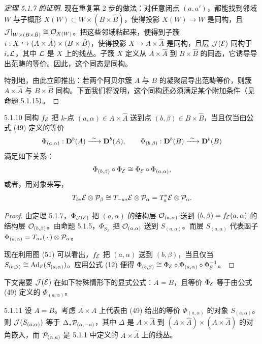 \begin{proof}[定理 5.1.7 的证明]
现在重复第 2 步的做法：对任意闭点 $(a,a')$，都能找到邻域 $W$ 与子概形 $X(W)\subset W\times(B\times\hat B)$，使得投影 $X(W)\to W$ 是同构，且 $\mathcal{J}|_{W\times(B\times\hat B)}\cong\mathcal{O}_{X(W)}$。把这些邻域粘起来，便得到子簇 $i:X\hookrightarrow(A\times\hat A)\times(B\times\hat B)$，使得投影 $X\to A\times\hat A$ 是同构，且层 $\mathcal{J}(\mathcal{E})$ 同构于 $i_*\mathcal{L}$，其中 $\mathcal{L}$ 是 $X$ 上的线丛。子簇 $X$ 定义从 $A\times\hat A$ 到 $B\times\hat B$ 的同态，它诱导导出范畴的等价。因此，这个同态是同构。

特别地，由此立即推出：若两个阿贝尔簇 $A$ 与 $B$ 的凝聚层导出范畴等价，则簇 $A\times\hat A$ 与 $B\times\hat B$ 同构。下面我们将说明，这个同构还必须满足某个附加条件（见命题 5.1.15）。
\end{proof}

\begin{corollary}{5.1.10}
同构 $f_{\mathcal{E}}$ 把 $k$-点 $(a,\alpha)\in A\times\hat A$ 送到点 $(b,\beta)\in B\times\hat B$，当且仅当由公式 (49) 定义的等价
\begin{equation*}
\Phi_{(a,\alpha)}:\mathbf{D}^{b}(A)\xrightarrow{\ \sim\ }\mathbf{D}^{b}(A),\qquad
\Phi_{(b,\beta)}:\mathbf{D}^{b}(B)\xrightarrow{\ \sim\ }\mathbf{D}^{b}(B)
\end{equation*}
满足如下关系：
\begin{equation*}
\Phi_{(b,\beta)}\circ\Phi_{\mathcal{E}}\cong\Phi_{\mathcal{E}}\circ\Phi_{(a,\alpha)},
\end{equation*}
或者，用对象来写，
\begin{equation*}
T_{b*}\mathcal{E}\otimes\mathcal{P}_\beta\cong T_{-a*}\mathcal{E}\otimes\mathcal{P}_\alpha=T^*_a\mathcal{E}\otimes\mathcal{P}_\alpha.
\end{equation*}
\end{corollary}

\begin{proof}
由定理 5.1.7，$\Phi_{\mathcal{J}(\mathcal{E})}$ 把 $(a,\alpha)$ 的结构层 $\mathcal{O}_{(a,\alpha)}$ 送到 $(b,\beta)=f_{\mathcal{E}}(a,\alpha)$ 的结构层 $\mathcal{O}_{(b,\beta)}$。由命题 5.1.5，$\Phi_{S_A}$ 把 $\mathcal{O}_{(a,\alpha)}$ 送到 $S_{(a,\alpha)}$。而层 $S_{(a,\alpha)}$ 代表函子 $\Phi_{(a,\alpha)}=T_{a*}(\,\cdot\,)\otimes\mathcal{P}_\alpha$。

现在利用图 (51) 可以看出，$f_{\mathcal{E}}$ 把 $(a,\alpha)$ 送到 $(b,\beta)$，当且仅当 $S_{(b,\beta)}\cong\mathrm{Ad}_{\mathcal{E}}(S_{(a,\alpha)})$。应用公式 (12) 便得 $\Phi_{(b,\beta)}\cong\Phi_{\mathcal{E}}\circ\Phi_{(a,\alpha)}\circ\Phi_{\mathcal{E}}^{-1}$。
\end{proof}

下文需要 $\mathcal{J}(\mathcal{E})$ 在如下特殊情形下的显式公式：$A=B$，且等价 $\Phi_{\mathcal{E}}$ 等于由公式 (49) 定义的 $\Phi_{(a,\alpha)}$。

\begin{proposition}{5.1.11}
设 $A=B$。考虑 $A\times A$ 上代表由 (49) 给出的等价 $\Phi_{(a,\alpha)}$ 的对象 $S_{(a,\alpha)}$。则 $\mathcal{J}(S_{(a,\alpha)})$ 等于 $\Delta_*\mathcal{P}_{(\alpha,-a)}$，其中 $\Delta$ 是 $A\times\hat A$ 到 $(A\times\hat A)\times(A\times\hat A)$ 的对角嵌入，而 $\mathcal{P}_{(\alpha,a)}$ 是 5.1.1 中定义的 $A\times\hat A$ 上的线丛。
\end{proposition}

